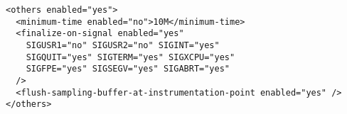 \begin{verbatim}
<others enabled="yes">
  <minimum-time enabled="no">10M</minimum-time>
  <finalize-on-signal enabled="yes" 
    SIGUSR1="no" SIGUSR2="no" SIGINT="yes"
    SIGQUIT="yes" SIGTERM="yes" SIGXCPU="yes"
    SIGFPE="yes" SIGSEGV="yes" SIGABRT="yes"
  />
  <flush-sampling-buffer-at-instrumentation-point enabled="yes" />
</others>
\end{verbatim}
